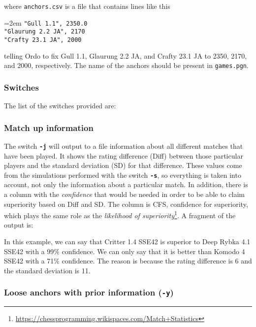 \documentclass[12pt]{article}
\newcommand{\swtch} [1] {\texttt{\textbf{#1}}}
\newcommand{\filename} [1] {\texttt{#1}}
\newcommand{\cmdln}[1]{
	\par
	\begingroup
		\leftskip=2em
		\addtolength{\rightskip}{0em}
		\noindent \small{\texttt{#1}}
		\par
	\endgroup
}
\newcommand{\inctxt}[1]{
	\begingroup
    \fontsize{9pt}{11pt}\selectfont
		 
	\endgroup
}
\begin{document}
where \filename{anchors.csv} is a file that contains lines like this

\cmdln{"Gull 1.1", 2350.0\\
"Glaurung 2.2 JA", 2170\\
"Crafty 23.1 JA", 2000}

telling Ordo to fix Gull 1.1, Glaurung 2.2 JA, and Crafty 23.1 JA to 2350, 2170, and 2000, respectively.
The name of the anchors should be present in \filename{games.pgn}.

\subsubsection*{Switches}

The list of the switches provided are:
\inctxt{tmp-switches.txt}

\subsubsection*{Match up information}

The switch \swtch{-j} will output to a file information about all different matches that have been played.
It shows the rating difference (Diff) between those particular players and the standard deviation (SD) for that difference.
These values come from the simulations performed with the switch \swtch{-s}, so everything is taken into account, not only the information about a particular match.
In addition, there is a column with the \textit{confidence} that would be needed in order to be able to claim superiority based on Diff and SD. 
The column is CFS, confidence for superiority, which plays the same role as the \textit{likelihood of superiority}\footnote{\url{https://chessprogramming.wikispaces.com/Match+Statistics}}.
A fragment of the output is:

\inctxt{readme-example-j-switch.txt}
In this example, we can say that Critter 1.4 SSE42 is superior to Deep Rybka 4.1 SSE42 with a 99\% confidence. We can only say that it is better than Komodo 4 SSE42 with a 71\% confidence. The reason is because the rating difference is 6 and the standard deviation is 11.


\subsubsection*{Loose anchors with prior information (\swtch{-y})}
\end{document}
